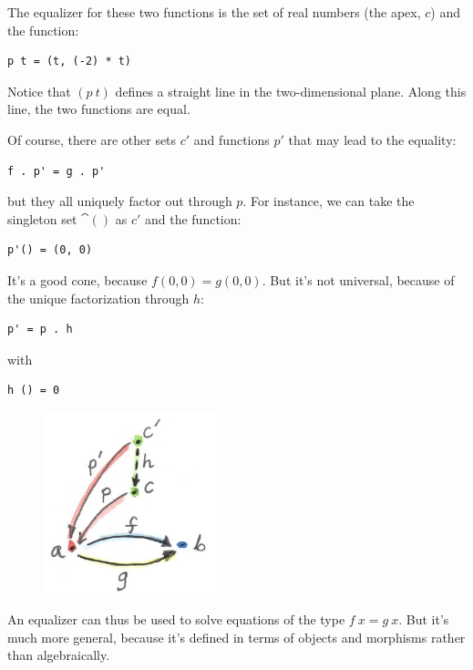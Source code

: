 The equalizer for these two functions is the set of real numbers (the
apex, $c$) and the function:

\begin{Verbatim}
p t = (t, (-2) * t)
\end{Verbatim}

Notice that $(p~t)$ defines a straight line in the
two-dimensional plane. Along this line, the two functions are equal.

Of course, there are other sets $c'$ and functions
$p'$ that may lead to the equality:

\begin{Verbatim}
f . p' = g . p'
\end{Verbatim}

but they all uniquely factor out through $p$. For instance, we
can take the singleton set $\cat{()}$ as $c'$ and the
function:

\begin{Verbatim}
p'() = (0, 0)
\end{Verbatim}

It's a good cone, because $f (0, 0) = g (0, 0)$. But it's
not universal, because of the unique factorization through $h$:

\begin{Verbatim}
p' = p . h
\end{Verbatim}

with

\begin{Verbatim}
h () = 0
\end{Verbatim}

\begin{figure}[H]
\centering
\includegraphics[width=50mm]{images/equilizerlimit.jpg}
\end{figure}

\noindent
An equalizer can thus be used to solve equations of the type
$f~x = g~x$. But it's much more general, because it's defined
in terms of objects and morphisms rather than algebraically.

